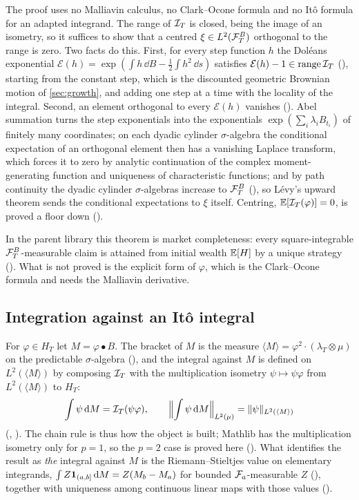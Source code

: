 \documentclass[11pt]{article}
\newcommand{\HT}{H_T}
\newcommand{\bulletB}{\mathbin{\bullet}}
\begin{document}
The proof uses no Malliavin calculus, no Clark--Ocone formula and no It\^o formula for an adapted integrand. The
range of $\mathcal{I}_T$ is closed, being the image of an isometry, so it suffices to show that a centred $\xi\in L^2(\mathcal{F}^B_T)$
orthogonal to the range is zero. Two facts do this. First, for every step function $h$ the Dol\'eans exponential
$\mathcal E(h)=\exp(\int h\,\dd B-\frac12\int h^2\,\dd s)$ satisfies $\mathcal E(h)-1\in\operatorname{range}\mathcal{I}_T$
(), starting from the constant step, which is the discounted geometric Brownian
motion of \cref{sec:growth}, and adding one step at a time with the locality of the integral. Second, an element
orthogonal to every $\mathcal E(h)$ vanishes (). Abel summation turns the step
exponentials into the exponentials $\exp(\sum_i\lambda_iB_{t_i})$ of finitely many coordinates; on each dyadic
cylinder $\sigma$-algebra the conditional expectation of an orthogonal element then has a vanishing Laplace transform,
which forces it to zero by analytic continuation of the complex moment-generating function and uniqueness of
characteristic functions; and by path continuity the dyadic cylinder $\sigma$-algebras increase to $\mathcal{F}^B_T$
(), so L\'evy's upward theorem sends the conditional expectations to
$\xi$ itself. Centring,
$\mathbb{E}[\mathcal{I}_T(\varphi)]=0$, is proved a floor down ().

In the parent library this theorem is market completeness: every square-integrable $\mathcal{F}^B_T$-measurable claim is
attained from initial wealth $\mathbb{E}[H]$ by a unique strategy (). What is not
proved is the explicit form of $\varphi$, which is the Clark--Ocone formula and needs the Malliavin derivative.

\subsection{Integration against an It\^o integral}\label{sec:against}
For $\varphi\in\HT$ let $M=\varphi\bulletB B$. The bracket of $M$ is the measure $\langle M\rangle=\varphi^2\cdot(\lambda_T\otimes\mu)$
on the predictable $\sigma$-algebra (), and the integral against $M$ is defined on
$L^2(\langle M\rangle)$ by composing $\mathcal{I}_T$ with the multiplication isometry $\psi\mapsto\psi\varphi$ from
$L^2(\langle M\rangle)$ to $\HT$:
\[
  \int\psi\,\mathrm{d} M=\mathcal{I}_T(\psi\varphi),\qquad\Bigl\lVert\int\psi\,\mathrm{d} M\Bigr\rVert_{L^2(\mu)}=\lVert \psi\rVert_{L^2(\langle M\rangle)}
\]
(, ). The chain rule is thus how the object is built; Mathlib has the multiplication isometry only for $p=1$, so the
$p=2$ case is proved here (). What identifies the result as \emph{the} integral against $M$ is the
Riemann--Stieltjes value on elementary integrands, $\int Z\mathbf{1}_{(a,b]}\,\mathrm{d} M=Z(M_b-M_a)$ for bounded
$\mathcal{F}_a$-measurable $Z$ (), together with uniqueness among continuous linear maps
with those values ().
\end{document}

